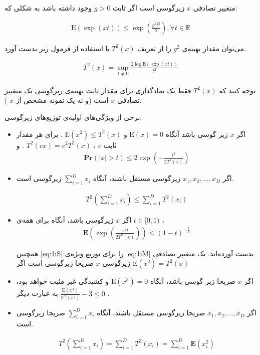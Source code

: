 متغییر تصادفی 
$x$
زیرگوسی است اگر ثابت 
$g > 0$
وجود داشته باشد به شکلی که:

\begin{align}
\mathrm{E}(\exp (xt)) \leq \exp \left( \frac{g^2 t^2}{2} \right), \forall t \in \mathbb{R}
\label{eq:1iN}
\end{align}

می‌توان مقدار بهینه‌ی 
$g^2$ 
را از تعریف 
$T^2(x)$
با استفاده از فرمول زیر بدست آورد.

\begin{align}
T^2(x) = \sup_{t \neq 0} \frac{2 \log \mathrm{E}\left(\exp(xt)\right)}{t^2}
\label{eq:1iP}
\end{align}

توجه کنید که 
$T^2(x)$
فقط یک نمادگذاری برای مقدار ثابت بهینه‌ی زیرگوسی یک متغییر تصادفی 
$x$
است (و نه یک نمونه مشخص از 
$x$
).

برخی از ویژگی‌های اولیه‌ی توزیع‌های زیرگوسی:

\begin{itemize}
\item
اگر 
$x$
زیر گوسی باشد آنگاه 
$\mathrm{E}(x) = 0$
و 
$\mathrm{E}(x^2) \leq T^2(x)$
. برای هر مقدار ثابت 
$c$
، 
$T^2(cx) = c^2T^2(x)$
. و
\begin{align}
\mathbf{Pr}(|x| > t) \leq 2 \exp \left( - \frac{t^2}{2T^2(x)} \right)
\label{eq:1iQ}
\end{align}
\item
اگر 
$x_1, x_2, \ldots, x_D$
زیرگوسی مستقل باشند، آنگاه
$\sum_{i=1}^D x_i$
زیرگوسی است.

\begin{align}
T^2 \left( \sum_{i=1}^D x_i \right) \leq \sum_{i=1}^D T^2(x_i)
\label{eq:1iR.0}
\end{align}
\item
اگر 
$x$
زیرگوسی باشد، آنگاه برای همه‌ی 
$t \in [0,1)$
،
\begin{align}
\mathbf{E} \left( \exp \left( \frac{x^2 t}{2 T^2(x)} \right) \right) \leq (1-t)^{- \frac{1}{2}}
\label{eq:1iS}
\end{align}

\cite{litez2, litez3}
همچنین 
\autoref{eq:1iS}
را برای توزیع ویژه‌ی
\autoref{eq:1iM}
بدست آورده‌اند. یک متغییر تصادفی زیرگوسی
$x$
صریحا زیرگوسی است اگر 
$\mathrm{E}(x^2) = T^2(x)$
\item
اگر 
$x$
صریحا زیر گوسی باشد، آنگاه 
‌$\mathrm{E}(x^3)=0$
و کشیدگی%
غیر مثبت خواهد بود، به عبارت دیگر 
$\frac{\mathrm{E}(x^4)}{\mathrm{E}^2(x^2)} - 3 \leq 0$
.
\item
اگر
$x_1, x_2, \ldots, x_D$
صریحا زیرگوسی مستقل باشند، آنگاه
$\sum_{i=1}^D x_i$
صریحا زیرگوسی است.

\begin{align}
T^2 \left( \sum_{i=1}^D x_i \right) = \sum_{i=1}^D T^2(x_i)
= \sum_{i=1}^D \mathbf{E} \left( x_i^2 \right)
\label{eq:1iR.1}
\end{align}
\end{itemize}

